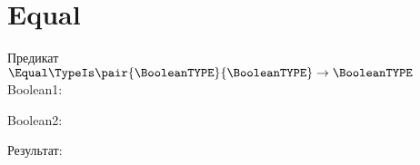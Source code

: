 \section{Equal}
\begin{frame}{Предикат $\Equal\TypeIs\pair{\BooleanTYPE}{\BooleanTYPE}\to\BooleanTYPE$}
	Boolean1:


	Boolean2:


	Результат:

\end{frame}

